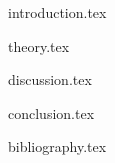 \documentclass{article}
\begin{document}
\clearpage
\thispagestyle{empty}

\tableofcontents

\clearpage
\thispagestyle{empty}

{introduction.tex}

\clearpage
\thispagestyle{empty}

{theory.tex}

\clearpage
\thispagestyle{empty}

{discussion.tex}

\clearpage
\thispagestyle{empty}

{conclusion.tex}

\clearpage
\thispagestyle{empty}

{bibliography.tex}
\end{document}
